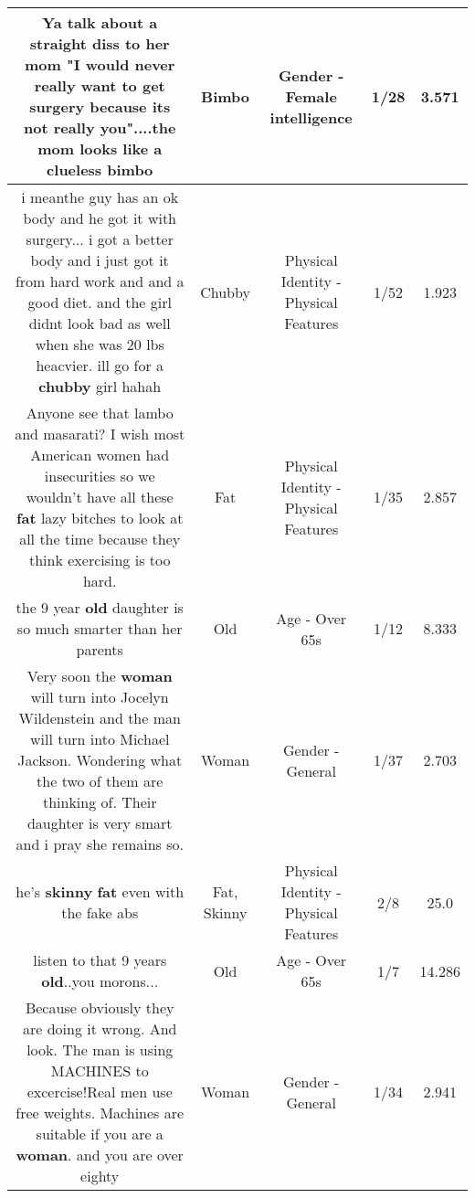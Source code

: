 \documentclass[11pt]{article}
\newlength\mylength
\begin{document}
\begin{center}
\begin{longtable}{|C{.65\mylength}|C{.30\mylength}|C{.12\mylength}|C{.12\mylength}|C{.12\mylength}|}
  \small Ya talk about a straight diss to her mom "I would never really want to get surgery because its not really you"....the mom looks like a clueless bimbo\normalsize   & Bimbo & Gender - Female intelligence & 1/28 & 3.571 \\  \hline
  \small i meanthe guy has an ok body and he got it with surgery... i got a better body and i just got it from hard work and and a good diet. and the girl didnt look bad as well when she was 20 lbs heacvier. ill go  for a \textbf{chubby} girl hahah\normalsize   & Chubby & Physical Identity - Physical Features & 1/52 & 1.923 \\  \hline
  \small Anyone see that lambo and masarati? I wish most American women had insecurities so we wouldn't have all these \textbf{fat} lazy bitches to look at all the time because they think exercising is too hard.\normalsize   & Fat & Physical Identity - Physical Features & 1/35 & 2.857 \\  \hline
  \small the 9 year \textbf{old} daughter is so much smarter than her parents\normalsize   & Old & Age - Over 65s & 1/12 & 8.333 \\  \hline
  \small Very soon the \textbf{woman} will turn into Jocelyn Wildenstein and the man will turn into Michael Jackson. Wondering what the two of them are thinking of. Their daughter is very smart and i pray she remains so.\normalsize   & Woman & Gender - General & 1/37 & 2.703 \\  \hline
  \small he's \textbf{skinny} \textbf{fat} even with the fake abs\normalsize   & Fat, Skinny & Physical Identity - Physical Features & 2/8 & 25.0 \\  \hline
  \small listen to that 9 years \textbf{old}..you morons...\normalsize   & Old & Age - Over 65s & 1/7 & 14.286 \\  \hline
  \small Because obviously they are doing it wrong. And look. The man is using MACHINES to excercise!Real men use free weights. Machines are suitable if you are a \textbf{woman}. and you are over eighty\normalsize   & Woman & Gender - General & 1/34 & 2.941 \\  \hline

\end{longtable}
\end{center}
\end{document}
